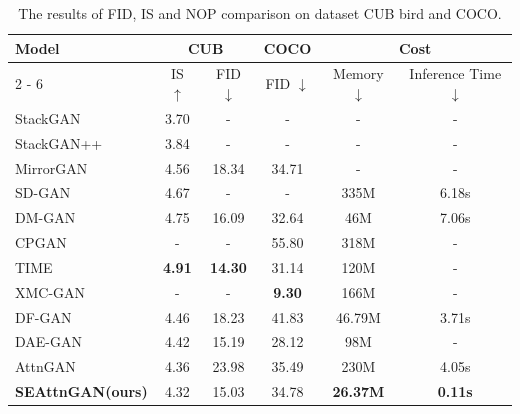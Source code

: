 \documentclass[runningheads, orivec]{llncs}
\begin{document}
\begin{table}[htbp]
        \caption{The results of FID, IS and NOP comparison on dataset CUB bird and COCO.}
	\begin{center}
	    \begin{tabular}{l|c|c|c|c|c}
		\hline {Model}  & \multicolumn{2}{|c|}{ CUB } & \multicolumn{1}{|c|}{ COCO } & \multicolumn{2}{|c}{Cost}\\
		\cline { 2 - 6 } & IS $\uparrow$ & FID $\downarrow$ & FID $\downarrow$ & Memory $\downarrow$ & Inference Time $\downarrow$ \\
		\hline StackGAN\cite{zhang2017stackgan}  & 3.70 & - & - & - & - \\
		StackGAN++\cite{zhang2018stackgan++}& 3.84 & - & - & - & -\\
		MirrorGAN\cite{qiao2019mirrorgan}  & 4.56 & 18.34 & 34.71 & - & - \\
		SD-GAN\cite{yin2019semantics}  & 4.67 & - & - & 335M & 6.18s\\
		DM-GAN\cite{zhu2019dm}  & 4.75 & 16.09 & 32.64 & 46M & 7.06s\\
		CPGAN\cite{liang2020cpgan}  & - & - & 55.80 & 318M & -\\
		TIME\cite{DBLP:conf/aaai/LiuSZME21} & \textbf{4.91} & \textbf{14.30} & 31.14 & 120M & -\\
		XMC-GAN\cite{zhang2021cross} & - & - & \textbf{9.30} & 166M & -\\
            DF-GAN\cite{tao2020df} & 4.46 & 18.23 & 41.83 & 46.79M & 3.71s \\
		DAE-GAN\cite{ruan2021dae}  & 4.42 & 15.19 & 28.12 & 98M & -\\
            \hline AttnGAN \cite{xu2018attngan} & 4.36 & 23.98 & 35.49 & 230M & 4.05s\\
		\textbf{SEAttnGAN(ours)} & 4.32 & 15.03 & 34.78 & \textbf{26.37M} & \textbf{0.11s} \\
		\hline
	    \end{tabular}
            \vspace{-20pt}
	\end{center}
    \label{tab1}
\end{table}
\end{document}
